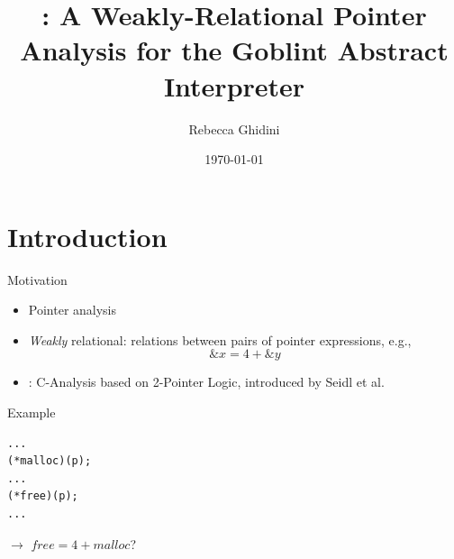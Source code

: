 \documentclass{beamer}
\title[\cpo{}: A Weakly-Relational Pointer Analysis]{\cpo{}: A Weakly-Relational Pointer Analysis for the Goblint Abstract Interpreter}
\author{Rebecca Ghidini}
\date{\today}
\begin{document}
\maketitle

\section{Introduction}
\frame{\tableofcontents[currentsection]}

\begin{frame}{Motivation}
    \begin{itemize}
        \item Pointer analysis
        \item \emph{Weakly} relational: relations between pairs of pointer expressions, e.g.,
              \[
                  \&x = 4 + \&y
              \]
        \item \cpo{}: C-Analysis based on 2-Pointer Logic, introduced by Seidl et al.~\cite{2pointer}
    \end{itemize}
\end{frame}

\begin{frame}[containsverbatim]{Example}
    \begin{minipage}{0.49\textwidth}

    \end{minipage}
    \begin{minipage}{0.49\textwidth}

        \begin{verbatim}
...
(*malloc)(p);
...
(*free)(p);
...
\end{verbatim}
        $\rightarrow$ $free = 4 + malloc$?
    \end{minipage}
\end{frame}
\end{document}
